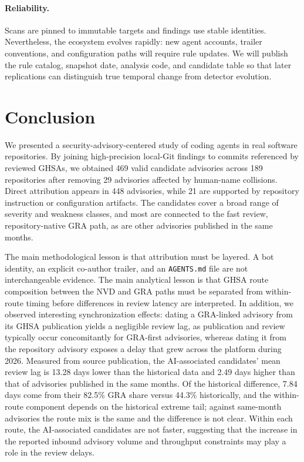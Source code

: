 \documentclass[smallextended,natbib]{svjour3}
\newcommand{\tool}[1]{\texttt{#1}}
\begin{document}
\paragraph{Reliability.}
Scans are pinned to immutable targets and
findings use stable identities.  Nevertheless, the ecosystem evolves rapidly:
new agent accounts, trailer conventions, and configuration paths will require
rule updates.  We will publish the rule catalog, snapshot date, analysis code,
and candidate table so that later replications can distinguish true temporal
change from detector evolution.



\section{Conclusion}
\label{sec:conclusion}

We presented a security-advisory-centered study of coding agents in real
software repositories.  By joining high-precision local-Git findings to commits
referenced by reviewed GHSAs, we obtained 469 valid candidate advisories across
189 repositories after removing 29 advisories affected by human-name
collisions.  Direct attribution appears in 448 advisories, while 21 are
supported   by repository instruction or configuration artifacts.  The
candidates cover a broad range of severity and weakness classes, and most are
connected to the fast review, repository-native GRA path, as are other advisories
published in the same months.

The main methodological lesson is that attribution must be layered.  A bot
identity, an explicit co-author trailer, and an \tool{AGENTS.md} file are not
interchangeable evidence.  The main analytical lesson is that GHSA route composition between the NVD and GRA paths
must be separated from within-route timing before differences in review latency
are interpreted. In addition, we observed interesting synchronization effects: dating a GRA-linked advisory from
its GHSA publication yields a negligible review lag, as publication and review typically occur concomitantly for GRA-first advisories,  whereas dating it from the
repository advisory exposes a delay that grew across the platform during 2026.
Measured from source publication, the AI-associated candidates' mean review lag is 13.28 days
lower than the historical data and 2.49 days higher than that of advisories
published in the same months.  Of the historical difference, 7.84 days come from
their 82.5\% GRA share versus 44.3\% historically, and the within-route
component depends on the historical extreme tail; against same-month advisories
the route mix is the same and the difference is not clear.  Within each route,
the AI-associated candidates are not faster, suggesting that the increase in the reported inbound advisory volume and throughput constraints may play a role in  the review delays. 
\end{document}
